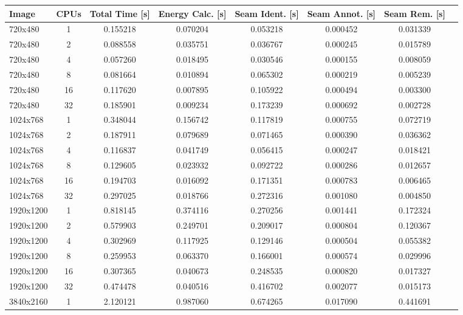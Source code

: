 \documentclass{article}
\begin{document}
\begin{table}[H]
    \centering
    \scriptsize
    \begin{tabular}{lccccccc}
        \toprule
        Image & CPUs & Total Time [s] & Energy Calc. [s] & Seam Ident. [s] & Seam Annot. [s] & Seam Rem. [s] \\
        \midrule
        720x480  & 1  & 0.155218 & 0.070204 & 0.053218 & 0.000452 & 0.031339 \\
        720x480  & 2  & 0.088558 & 0.035751 & 0.036767 & 0.000245 & 0.015789 \\
        720x480  & 4  & 0.057260 & 0.018495 & 0.030546 & 0.000155 & 0.008059 \\
        720x480  & 8  & 0.081664 & 0.010894 & 0.065302 & 0.000219 & 0.005239 \\
        720x480  & 16 & 0.117620 & 0.007895 & 0.105922 & 0.000494 & 0.003300 \\
        720x480  & 32 & 0.185901 & 0.009234 & 0.173239 & 0.000692 & 0.002728 \\
        \midrule
        1024x768 & 1  & 0.348044 & 0.156742 & 0.117819 & 0.000755 & 0.072719 \\
        1024x768 & 2  & 0.187911 & 0.079689 & 0.071465 & 0.000390 & 0.036362 \\
        1024x768 & 4  & 0.116837 & 0.041749 & 0.056415 & 0.000247 & 0.018421 \\
        1024x768 & 8  & 0.129605 & 0.023932 & 0.092722 & 0.000286 & 0.012657 \\
        1024x768 & 16 & 0.194703 & 0.016092 & 0.171351 & 0.000783 & 0.006465 \\
        1024x768 & 32 & 0.297025 & 0.018766 & 0.272316 & 0.001080 & 0.004850 \\
        \midrule
        1920x1200 & 1  & 0.818145 & 0.374116 & 0.270256 & 0.001441 & 0.172324 \\
        1920x1200 & 2  & 0.579903 & 0.249701 & 0.209017 & 0.000804 & 0.120367 \\
        1920x1200 & 4  & 0.302969 & 0.117925 & 0.129146 & 0.000504 & 0.055382 \\
        1920x1200 & 8  & 0.259953 & 0.063370 & 0.166001 & 0.000574 & 0.029996 \\
        1920x1200 & 16 & 0.307365 & 0.040673 & 0.248535 & 0.000820 & 0.017327 \\
        1920x1200 & 32 & 0.474478 & 0.040516 & 0.416702 & 0.002077 & 0.015173 \\
        \midrule
        3840x2160 & 1  & 2.120121 & 0.987060 & 0.674265 & 0.017090 & 0.441691 \\

\end{tabular}
\end{table}
\end{document}
